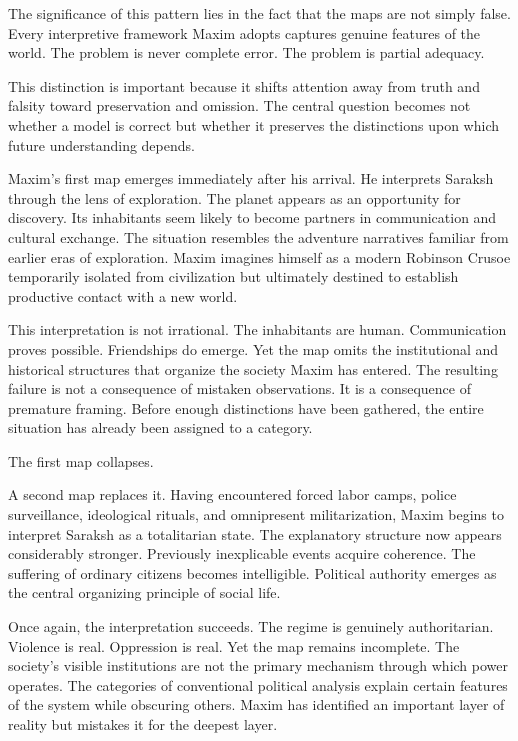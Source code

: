 \documentclass[12pt, a4paper]{article}
\theoremstyle{plain}
\theoremstyle{definition}
\theoremstyle{remark}
\begin{document}
The significance of this pattern lies in the fact
that the maps are not simply false. Every
interpretive framework Maxim adopts captures
genuine features of the world. The problem is
never complete error. The problem is partial
adequacy.

This distinction is important because it shifts
attention away from truth and falsity toward
preservation and omission. The central question
becomes not whether a model is correct but whether
it preserves the distinctions upon which future
understanding depends.

Maxim's first map emerges immediately after his
arrival. He interprets Saraksh through the lens
of exploration. The planet appears as an
opportunity for discovery. Its inhabitants seem
likely to become partners in communication and
cultural exchange. The situation resembles the
adventure narratives familiar from earlier eras
of exploration. Maxim imagines himself as a
modern Robinson Crusoe temporarily isolated from
civilization but ultimately destined to establish
productive contact with a new world.

This interpretation is not irrational. The
inhabitants are human. Communication proves
possible. Friendships do emerge. Yet the map
omits the institutional and historical structures
that organize the society Maxim has entered.
The resulting failure is not a consequence of
mistaken observations. It is a consequence of
premature framing. Before enough distinctions
have been gathered, the entire situation has
already been assigned to a category.

The first map collapses.

A second map replaces it. Having encountered
forced labor camps, police surveillance,
ideological rituals, and omnipresent
militarization, Maxim begins to interpret Saraksh
as a totalitarian state. The explanatory structure
now appears considerably stronger. Previously
inexplicable events acquire coherence. The
suffering of ordinary citizens becomes
intelligible. Political authority emerges as the
central organizing principle of social life.

Once again, the interpretation succeeds. The
regime is genuinely authoritarian. Violence is
real. Oppression is real. Yet the map remains
incomplete. The society's visible institutions
are not the primary mechanism through which power
operates. The categories of conventional political
analysis explain certain features of the system
while obscuring others. Maxim has identified an
important layer of reality but mistakes it for
the deepest layer.
\end{document}
